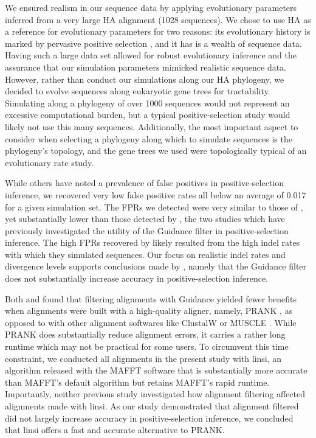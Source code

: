 \documentclass[10pt]{article}
\begin{document}
We ensured realism in our sequence data by applying evolutionary parameters inferred from a very large HA alignment (1028 sequences). We chose to use HA as a reference for evolutionary parameters for two reasons: its evolutionary history is marked by pervasive positive selection \citep{Bush1999, Kryazhimskiy2008, Meyer2012}, and it has is a wealth of sequence data. Having such a large data set allowed for robust evolutionary inference and the assurance that our simulation parameters mimicked realistic sequence data. However, rather than conduct our simulations along our HA phylogeny, we decided to evolve sequences along eukaryotic gene trees for tractability. Simulating along a phylogeny of over 1000 sequences would not represent an excessive computational burden, but a typical positive-selection study would likely not use this many sequences. Additionally, the most important aspect to consider when selecting a phylogeny along which to simulate sequences is the phylogeny's topology, and the gene trees we used were topologically typical of an evolutionary rate study.

While others \citep{Schneider2009, Fletcher2010, MarkovaRaina2011,Privman2012} have noted a prevalence of false positives in positive-selection inference, we recovered very low false positive rates all below an average of 0.017 for a given simulation set. The FPRs we detected were very similar to those of \citet{Jordan2012}, yet substantially lower than those detected by \citet{Privman2012}, the two studies which have previously investigated the utility of the Guidance filter in positive-selection inference. The high FPRs recovered by \citet{Privman2012} likely resulted from the high indel rates with which they simulated sequences. Our focus on realistic indel rates and divergence levels supports conclusions made by \citet{Jordan2012}, namely that the Guidance filter does not substantially increase accuracy in positive-selection inference.

Both \citet{Privman2012} and \citet{Jordan2012} found that filtering alignments with Guidance yielded fewer benefits when alignments were built with a high-quality aligner, namely, PRANK \citep{Loytynoja2008}, as opposed to with other alignment softwares like ClustalW \citep{Thompson2004}or MUSCLE \citep{Edgar2004}. While PRANK does substantially reduce alignment errors, it carries a rather long runtime which may not be practical for some users. To circumvent this time constraint, we conducted all alignments in the present study with linsi, an algorithm released with the MAFFT software that is substantially more accurate than MAFFT's default algorithm \citep{Katoh2005, Nuin2006, Thompson2011} but retains MAFFT's rapid runtime. Importantly, neither previous study investigated how alignment filtering affected alignments made with linsi. As our study demonstrated that alignment filtered did not largely increase accuracy in positive-selection inference, we concluded that linsi offers a fast and accurate alternative to PRANK.
\end{document}

